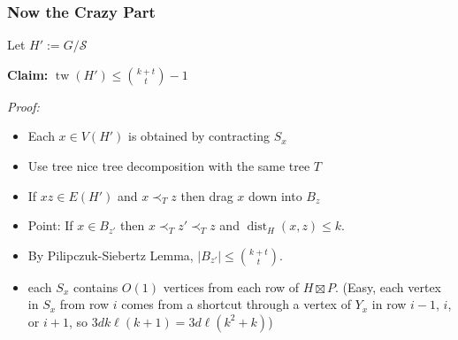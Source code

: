 \documentclass[xcolor=dvipsnames]{beamer}
\DeclareMathOperator{\tw}{tw}
\begin{document}
\begin{frame}
  \frametitle{Now the Crazy Part}
  
    Let $H':=G/\mathcal{S}$
    
    \textbf{Claim:} $\tw(H')\le\binom{k+t}{t}-1$
    
    \textit{Proof:}
    \begin{itemize}
      \item Each $x\in V(H')$ is obtained by contracting $S_x$
      \item Use tree nice tree decomposition with the same tree $T$
      \item If $xz\in E(H')$ and $x\prec_T z$ then drag $x$ down into $B_z$
      \item Point: If $x\in B_{z'}$ then $x\prec_T z'\prec_T z$ and $\mathop{dist}_{H}(x,z)\le k$.  
      \item By Pilipczuk-Siebertz Lemma, $|B_{z'}|\le \binom{k+t}{t}$.
    \end{itemize}
\end{frame}




\begin{frame}
  \begin{itemize}
    \item each $S_x$ contains $O(1)$ vertices from each row of $H\boxtimes P$. (Easy, each vertex in $S_x$ from row $i$ comes from a shortcut through a vertex of $Y_x$ in row $i-1$, $i$, or $i+1$, so $3dk\ell(k+1)=3d\ell(k^2+k)$) 
  \end{itemize}
\end{frame}
  
\end{document}
